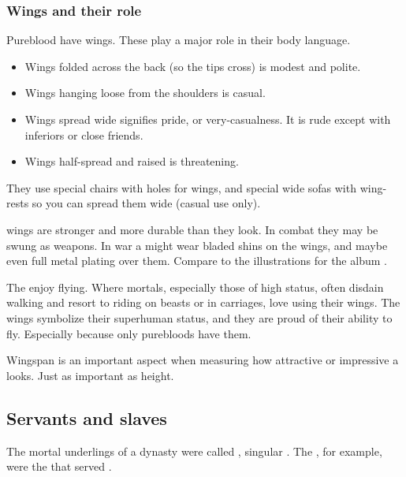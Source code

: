 \subsubsection{Wings and their role}
Pureblood \resphain{} have wings. 
These play a major role in their body language. 

\begin{itemize}
  \item 
    Wings folded across the back (so the tips cross) is modest and polite. 
  \item 
    Wings hanging loose from the shoulders is casual. 
  \item 
    Wings spread wide signifies pride, or very-casualness. 
    It is rude except with inferiors or close friends. 
  \item 
    Wings half-spread and raised is threatening. 
\end{itemize}

They use special chairs with holes for wings, and special wide sofas with wing-rests so you can spread them wide (casual use only). 

\Resphan{} wings are stronger and more durable than they look. 
In combat they may be swung as weapons. 
In war a \resphan{} might wear bladed shins on the wings, and maybe even full metal plating over them. 
Compare to the illustrations for the album . 

The \resphain{} enjoy flying. 
Where mortals, especially those of high status, often disdain walking and resort to riding on beasts or in carriages, \resphain{} love using their wings. 
The wings symbolize their superhuman status, and they are proud of their ability to fly. 
Especially because only purebloods have them. 

Wingspan is an important aspect when measuring how attractive or impressive a \resphan{} looks. 
Just as important as height. 









\subsection{Servants and slaves}
The mortal underlings of a \resphan dynasty were called \hedrim, singular \hedor. 
The \hedrim[\Mystraacht], for example, were the \hedrim that served \Mystraacht. 

